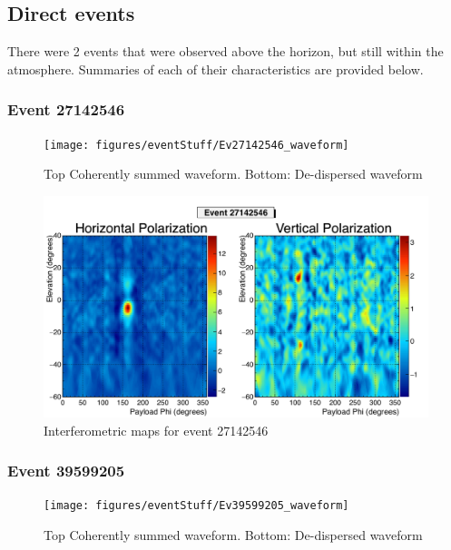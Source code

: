 	
	
	
	\subsection{Direct events}
		There were 2 events that were observed above the horizon, but still within the atmosphere.  Summaries of each of their characteristics are provided below.	
		\subsubsection{Event 27142546}
			\begin{figure}
			\centering
				\texttt{[image: figures/eventStuff/Ev27142546\_waveform]}
				\caption{Top Coherently summed waveform.  Bottom: De-dispersed waveform} 
			\label{fig:Ev27142546_waveform}
			\end{figure}		

		\begin{figure}
		\centering
			\includegraphics[width=\textwidth]{figures/intMap/intMap_ev27142546}
			\caption{Interferometric maps for event 27142546} 
		\label{fig:Ev27142546_map}
		\end{figure}			
			
				\subsubsection{Event 39599205}
			\begin{figure}
			\centering
				\texttt{[image: figures/eventStuff/Ev39599205\_waveform]}
				\caption{Top Coherently summed waveform.  Bottom: De-dispersed waveform} 
			\label{fig:Ev39599205_waveform}
			\end{figure}
			
